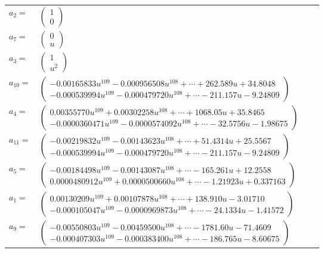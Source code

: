 \documentclass[1p]{elsarticle_modified}
\theoremstyle{definition}
\begin{document}
\begin{tabular}{m{7pt} m{180pt} m{7pt} m{180pt} }
\flushright $a_{2}=$&$\begin{pmatrix}1\\0\end{pmatrix}$ \\
\flushright $a_{7}=$&$\begin{pmatrix}0\\u\end{pmatrix}$ \\
\flushright $a_{3}=$&$\begin{pmatrix}1\\u^2\end{pmatrix}$ \\
\flushright $a_{10}=$&$\begin{pmatrix}-0.00165833 u^{109}-0.000956508 u^{108}+\cdots+262.589 u+34.8048\\-0.000539994 u^{109}-0.000479720 u^{108}+\cdots-211.157 u-9.24809\end{pmatrix}$ \\
\flushright $a_{4}=$&$\begin{pmatrix}0.00355770 u^{109}+0.00302258 u^{108}+\cdots+1068.05 u+35.8465\\-0.0000360471 u^{109}-0.0000574092 u^{108}+\cdots-32.5756 u-1.98675\end{pmatrix}$ \\
\flushright $a_{11}=$&$\begin{pmatrix}-0.00219832 u^{109}-0.00143623 u^{108}+\cdots+51.4314 u+25.5567\\-0.000539994 u^{109}-0.000479720 u^{108}+\cdots-211.157 u-9.24809\end{pmatrix}$ \\
\flushright $a_{5}=$&$\begin{pmatrix}-0.00184498 u^{109}-0.00143087 u^{108}+\cdots-165.261 u+12.2558\\0.0000480912 u^{109}+0.0000500660 u^{108}+\cdots-1.21923 u+0.337163\end{pmatrix}$ \\
\flushright $a_{1}=$&$\begin{pmatrix}0.00130209 u^{109}+0.00107878 u^{108}+\cdots+138.910 u-3.01710\\-0.000105047 u^{109}-0.0000969873 u^{108}+\cdots-24.1334 u-1.41572\end{pmatrix}$ \\
\flushright $a_{9}=$&$\begin{pmatrix}-0.00550803 u^{109}-0.00459500 u^{108}+\cdots-1781.60 u-71.4609\\-0.000407303 u^{109}-0.000383400 u^{108}+\cdots-186.765 u-8.60675\end{pmatrix}$ \\

\end{tabular}
\end{document}
